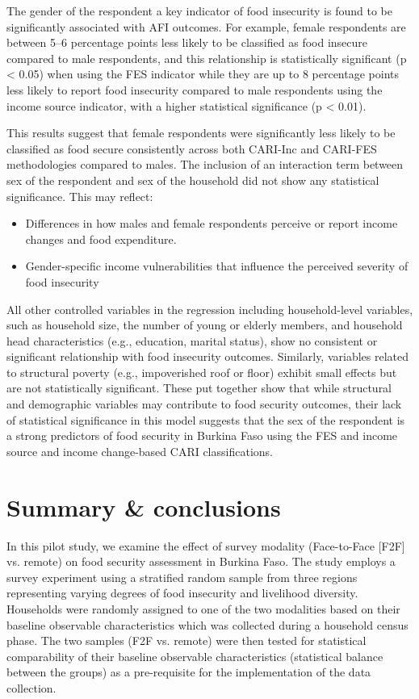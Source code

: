 \documentclass[11pt,harvard]{article}
\begin{document}
	The gender of the respondent a key indicator of food insecurity is found to be significantly associated with AFI outcomes. For example, female respondents are between 5–6 percentage points less likely to be classified as food insecure compared to male respondents, and this relationship is statistically significant (p < 0.05) when using the FES indicator while they are up to 8 percentage points less likely to report food insecurity compared to male respondents using the income source indicator, with a higher statistical significance (p < 0.01).
	
	This results suggest that female respondents were significantly less likely to be classified as food secure consistently across both CARI-Inc and CARI-FES methodologies compared to males. The inclusion of an interaction term between sex of the respondent and sex of the household did not show any statistical significance. This may reflect:
	\begin{itemize}
	\item Differences in how males and female respondents perceive or report income changes and food expenditure.
	\item Gender-specific income vulnerabilities that influence the perceived severity of food insecurity
	\end{itemize}
	All other controlled variables in the regression including household-level variables, such as household size, the number of young or elderly members, and household head characteristics (e.g., education, marital status), show no consistent or significant relationship with food insecurity outcomes.	Similarly, variables related to structural poverty (e.g., impoverished roof or floor) exhibit small effects but are not statistically significant. These put together show that while structural and demographic variables may contribute to food security outcomes, their lack of statistical significance in this model suggests that the sex of the respondent is a strong predictors of food security in Burkina Faso using the FES and income source and income change-based CARI classifications.
	
	
	\pagebreak
	
	
	\section{Summary \& conclusions}
	
	In this pilot study, we examine the effect of survey modality (Face-to-Face [F2F] vs. remote) on food security assessment in Burkina Faso. The study employs a survey experiment using a stratified random sample from three regions representing varying degrees of food insecurity and livelihood diversity. Households were randomly assigned to one of the two modalities based on their baseline observable characteristics which was collected during a household census phase. The two samples (F2F vs. remote) were then tested for statistical comparability of their baseline observable characteristics (statistical balance between the groups) as a pre-requisite for the implementation of the data collection.
\end{document}
